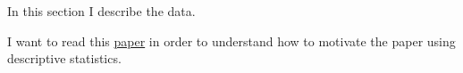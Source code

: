 \documentclass[source/paper/main.tex]{subfiles}
\begin{document}
In this section I describe the data. 

I want to read this  \href{https://pubs.aeaweb.org/doi/pdfplus/10.1257/jep.36.3.211}{paper} in order to understand how to motivate the paper using descriptive statistics. 
\end{document}
